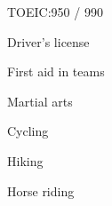 \begin{SideBar}{\ColorBackground}{\ColorTextSide}
  \begin{ItemList}{\ColorHighlight}
    \item [\ding{226}] TOEIC:\@ 950 / 990
    \item [\ding{226}] Driver's license
    \item [\ding{226}] First aid in teams
  \end{ItemList}
  \vspace{0.5cm}

  \vspace{-\baselineskip}
  \begin{multicols}{2}
    \begin{ItemList}{\ColorHighlight}
      \item Martial arts
      \item Cycling
      \item Hiking
      \item Horse riding
    \end{ItemList}
  \end{multicols}
\end{SideBar}